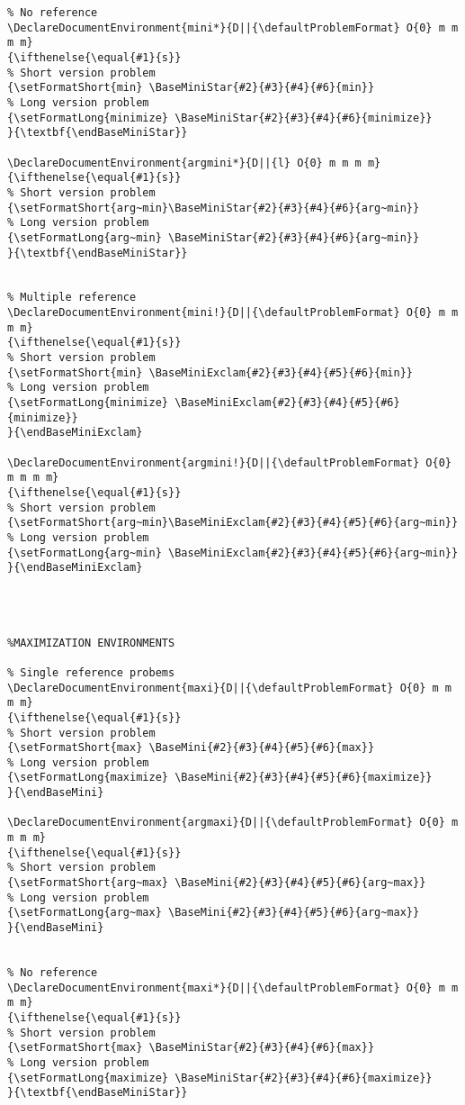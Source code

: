 \documentclass[a4paper]{article}
\begin{document}
\begin{lstlisting}
% No reference
\DeclareDocumentEnvironment{mini*}{D||{\defaultProblemFormat} O{0} m m m m}
{\ifthenelse{\equal{#1}{s}}
% Short version problem
{\setFormatShort{min} \BaseMiniStar{#2}{#3}{#4}{#6}{min}}
% Long version problem	
{\setFormatLong{minimize} \BaseMiniStar{#2}{#3}{#4}{#6}{minimize}}
}{\textbf{\endBaseMiniStar}}

\DeclareDocumentEnvironment{argmini*}{D||{l} O{0} m m m m}
{\ifthenelse{\equal{#1}{s}}
% Short version problem
{\setFormatShort{arg~min}\BaseMiniStar{#2}{#3}{#4}{#6}{arg~min}}
% Long version problem	
{\setFormatLong{arg~min} \BaseMiniStar{#2}{#3}{#4}{#6}{arg~min}}
}{\textbf{\endBaseMiniStar}}


% Multiple reference
\DeclareDocumentEnvironment{mini!}{D||{\defaultProblemFormat} O{0} m m m m}
{\ifthenelse{\equal{#1}{s}}
% Short version problem
{\setFormatShort{min} \BaseMiniExclam{#2}{#3}{#4}{#5}{#6}{min}}
% Long version problem	
{\setFormatLong{minimize} \BaseMiniExclam{#2}{#3}{#4}{#5}{#6}{minimize}}
}{\endBaseMiniExclam}

\DeclareDocumentEnvironment{argmini!}{D||{\defaultProblemFormat} O{0} m m m m}
{\ifthenelse{\equal{#1}{s}}
% Short version problem
{\setFormatShort{arg~min}\BaseMiniExclam{#2}{#3}{#4}{#5}{#6}{arg~min}}
% Long version problem	
{\setFormatLong{arg~min} \BaseMiniExclam{#2}{#3}{#4}{#5}{#6}{arg~min}}
}{\endBaseMiniExclam}




%MAXIMIZATION ENVIRONMENTS

% Single reference probems
\DeclareDocumentEnvironment{maxi}{D||{\defaultProblemFormat} O{0} m m m m}
{\ifthenelse{\equal{#1}{s}}
% Short version problem
{\setFormatShort{max} \BaseMini{#2}{#3}{#4}{#5}{#6}{max}}
% Long version problem	
{\setFormatLong{maximize} \BaseMini{#2}{#3}{#4}{#5}{#6}{maximize}}
}{\endBaseMini}

\DeclareDocumentEnvironment{argmaxi}{D||{\defaultProblemFormat} O{0} m m m m}
{\ifthenelse{\equal{#1}{s}}
% Short version problem
{\setFormatShort{arg~max} \BaseMini{#2}{#3}{#4}{#5}{#6}{arg~max}}
% Long version problem	
{\setFormatLong{arg~max} \BaseMini{#2}{#3}{#4}{#5}{#6}{arg~max}}
}{\endBaseMini}


% No reference
\DeclareDocumentEnvironment{maxi*}{D||{\defaultProblemFormat} O{0} m m m m}
{\ifthenelse{\equal{#1}{s}}
% Short version problem
{\setFormatShort{max} \BaseMiniStar{#2}{#3}{#4}{#6}{max}}
% Long version problem	
{\setFormatLong{maximize} \BaseMiniStar{#2}{#3}{#4}{#6}{maximize}}
}{\textbf{\endBaseMiniStar}}


\end{lstlisting}
\end{document}
